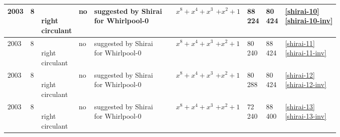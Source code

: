 \begin{footnotesize}
\begin{longtable}[c]{|l|l|l|l|l|l|l|l|l|l|}
2003 & 8 & \shortstack{\\ right \\ circulant} & no & \shortstack{suggested by Shirai \\ for Whirlpool-0} & \cite{Shirai2003} & \shortstack{$x^8+x^4+x^3$\\$+x^2+1$} & \shortstack{88\\224} & \shortstack{80\\424} & \shortstack{\eqref{shirai-10}\\\eqref{shirai-10-inv}} \\ \hline
2003 & 8 & \shortstack{\\ right \\ circulant} & no & \shortstack{suggested by Shirai \\ for Whirlpool-0} & \cite{Shirai2003} & \shortstack{$x^8+x^4+x^3$\\$+x^2+1$} & \shortstack{80\\240} & \shortstack{88\\424} & \shortstack{\eqref{shirai-11}\\\eqref{shirai-11-inv}} \\ \hline
2003 & 8 & \shortstack{\\ right \\ circulant} & no & \shortstack{suggested by Shirai \\ for Whirlpool-0} & \cite{Shirai2003} & \shortstack{$x^8+x^4+x^3$\\$+x^2+1$} & \shortstack{80\\288} & \shortstack{80\\424} & \shortstack{\eqref{shirai-12}\\\eqref{shirai-12-inv}} \\ \hline
2003 & 8 & \shortstack{\\ right \\ circulant} & no & \shortstack{suggested by Shirai \\ for Whirlpool-0} & \cite{Shirai2003} & \shortstack{$x^8+x^4+x^3$\\$+x^2+1$} & \shortstack{72\\240} & \shortstack{88\\400} & \shortstack{\eqref{shirai-13}\\\eqref{shirai-13-inv}} \\ \hline


\end{longtable}
\end{footnotesize}
